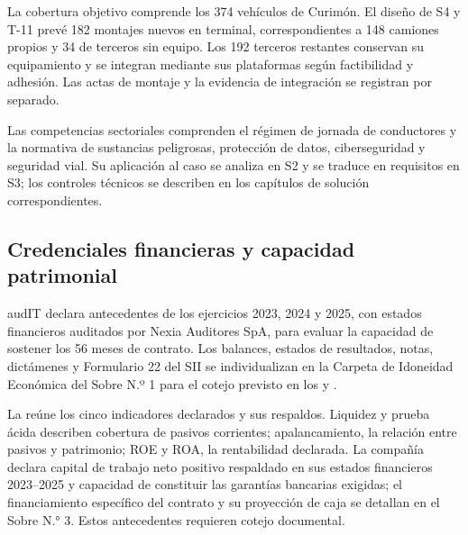 La cobertura objetivo comprende los 374 vehículos de Curimón. El diseño de S4 y T-11 prevé 182 montajes nuevos en terminal, correspondientes a 148 camiones propios y 34 de terceros sin equipo. Los 192 terceros restantes conservan su equipamiento y se integran mediante sus plataformas según factibilidad y adhesión. Las actas de montaje y la evidencia de integración se registran por separado.


Las competencias sectoriales comprenden el régimen de jornada de conductores y la normativa de sustancias peligrosas, protección de datos, ciberseguridad y seguridad vial. Su aplicación al caso se analiza en S2 y se traduce en requisitos en S3; los controles técnicos se describen en los capítulos de solución correspondientes.

\subsection{Credenciales financieras y capacidad patrimonial}\label{sec:1-financiero}

audIT declara antecedentes de los ejercicios 2023, 2024 y 2025, con estados financieros auditados por Nexia Auditores SpA, para evaluar la capacidad de sostener los 56 meses de contrato. Los balances, estados de resultados, notas, dictámenes y Formulario 22 del SII se individualizan en la Carpeta de Idoneidad Económica del Sobre N.º 1 para el cotejo previsto en los  y .

La  reúne los cinco indicadores declarados y sus respaldos. Liquidez y prueba ácida describen cobertura de pasivos corrientes; apalancamiento, la relación entre pasivos y patrimonio; ROE y ROA, la rentabilidad declarada. La compañía declara capital de trabajo neto positivo respaldado en sus estados financieros 2023--2025 y capacidad de constituir las garantías bancarias exigidas; el financiamiento específico del contrato y su proyección de caja se detallan en el Sobre N.° 3. Estos antecedentes requieren cotejo documental.

